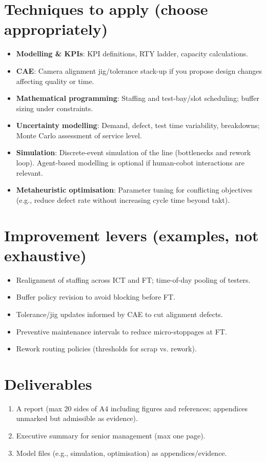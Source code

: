 \documentclass[11pt,a4paper]{article}
\begin{document}
\section*{Techniques to apply (choose appropriately)}
\begin{itemize}
\item \textbf{Modelling \& KPIs}: KPI definitions, RTY ladder, capacity calculations.
\item \textbf{CAE}: Camera alignment jig/tolerance stack-up if you propose design changes affecting quality or time.
\item \textbf{Mathematical programming}: Staffing and test-bay/slot scheduling; buffer sizing under constraints.
\item \textbf{Uncertainty modelling}: Demand, defect, test time variability, breakdowns; Monte Carlo assessment of service level.
\item \textbf{Simulation}: Discrete-event simulation of the line (bottlenecks and rework loop). Agent-based modelling is optional if human-cobot interactions are relevant.
\item \textbf{Metaheuristic optimisation}: Parameter tuning for conflicting objectives (e.g., reduce defect rate without increasing cycle time beyond takt).
\end{itemize}
\section*{Improvement levers (examples, not exhaustive)}
\begin{itemize}
\item Realignment of staffing across ICT and FT; time-of-day pooling of testers.
\item Buffer policy revision to avoid blocking before FT.
\item Tolerance/jig updates informed by CAE to cut alignment defects.
\item Preventive maintenance intervals to reduce micro-stoppages at FT.
\item Rework routing policies (thresholds for scrap vs. rework).
\end{itemize}
\section*{Deliverables}
\begin{enumerate}
\item A report (max 20 sides of A4 including figures and references; appendices unmarked but admissible as evidence).
\item Executive summary for senior management (max one page).
\item Model files (e.g., simulation, optimisation) as appendices/evidence.
\end{enumerate}
\end{document}
